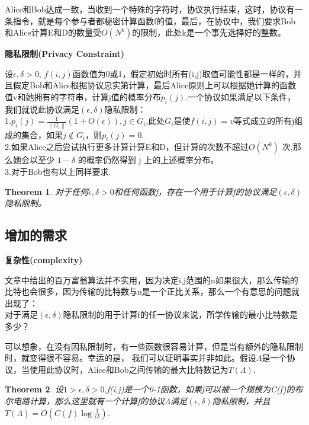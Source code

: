 \documentclass[]{article}
\newtheorem{theorem}{Theorem}
\begin{document}
	Alice和Bob达成一致，当收到一个特殊的字符时，协议执行结束，这时，协议有一条指令，就是每个参与者都秘密计算函数f的值，最后，在协议中，我们要求Bob和Alice计算E和D的数量受$O(N^k)$的限制，此处k是一个事先选择好的整数。\par
	
	\textbf{隐私限制(Privacy Constraint)}\par
	
	设$\epsilon,\delta >0$, $f(i,j)$函数值为0或1，假定初始时所有(i,j)取值可能性都是一样的，并且假定Bob和Alice根据协议忠实第计算，最后Alice原则上可以根据她计算的函数值v和她拥有的字符串，计算j值的概率分布$p_i(j)$.一个协议如果满足以下条件，我们就说此协议满足$(\epsilon,\delta)$隐私限制：\\
	1.$p_i(j)=\frac{1}{\|G_i\|} (1+O(\epsilon)),j\in G_i$,此处$G_i$是使$f(i,j)=v$等式成立的所有j组成的集合，如果$j\notin G_i$，则$p_i(j)=0$.\\
	2.如果Alice之后尝试执行更多计算计算E和D，但计算的次数不超过$ O(N^k)$ 次,那么她会以至少 $1 − \delta$ 的概率仍然得到 j 上的上述概率分布。\\
	3.对于Bob也有以上同样要求.
	\par
	
	\begin{theorem}
		对于任何$\epsilon,\delta >0$和任何函数f，存在一个用于计算f的协议满足$(\epsilon,\delta)$隐私限制。
	\end{theorem}

	\subsection{增加的需求}
	\textbf{复杂性(complexity)}\par
	文章中给出的百万富翁算法并不实用，因为决定i,j范围的n如果很大，那么传输的比特也会很多，因为传输的比特数与n是一个正比关系，那么一个有意思的问题就出现了：\\
	对于满足$(\epsilon,\delta)$隐私限制的用于计算f的任一协议来说，所学传输的最小比特数是多少？
	\par
	可以想象，在没有因私限制时，有一些函数很容易计算，但是当有额外的隐私限制时，就变得很不容易。幸运的是，
	我们可以证明事实并非如此。假设$\Lambda$是一个协议，当使用此协议时，Alice和Bob之间传输的最大比特数记为$T(\Lambda)$.\par
	
	\begin{theorem}
		设$1>\epsilon,\delta >0$,f(i,j)是一个0-1函数，如果f可以被一个规模为C(f)的布尔电路计算，那么这里就有一个计算f的协议$\Lambda$满足$(\epsilon,\delta)$隐私限制，并且$T(\Lambda)=O(C(f)\log \frac{1}{\epsilon \delta})$.
	\end{theorem}
\end{document}
